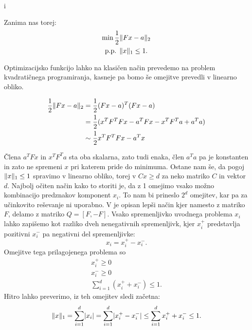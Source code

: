 i\documentclass[mat1]{fmfdelo}
\DeclarePairedDelimiter{\abs}{\lvert}{\rvert}
\DeclarePairedDelimiter{\norm}{\lVert}{\rVert}
\begin{document}
\noindent Zanima nas torej:
\begin{gather*}
    \min \frac{1}{2} \norm{Fx-a}_2 \\
    \text{p.p. } \norm{x}_1 \leq 1.
\end{gather*}

Optimizacijsko funkcijo lahko na klasičen način prevedemo na problem kvadra\-tičnega programiranja, kasneje pa bomo še omejitve prevedli v linearno obliko.

\begin{align*}
        \frac{1}{2} \norm{Fx-a}_2 &= \frac{1}{2} (Fx-a)^T(Fx-a) \\
         &= \frac{1}{2} (x^T F^T F x - a^TFx - x^TF^Ta + a^Ta) \\
         &\sim \frac{1}{2} x^T F^T F x - a^Tx
\end{align*}

Člena $a^TFx$ in $x^TF^Ta$ sta oba skalarna, zato tudi enaka, člen $a^T a$ pa je konstanten in zato ne spremeni $x$ pri katerem pride do minimuma. Ostane nam še, da pogoj $\norm{x}_1 \leq 1$ spravimo v linearno obliko, torej v $Cx \geq d$ za neko matriko $C$ in vektor $d$. Najbolj očiten način kako to storiti je, da z 1 omejimo vsako možno kombinacijo predznakov komponent $x_i$. To nam bi prineslo $2^d$ omejitev, kar pa za učinkovito reševanje ni uporabno. V \cite{l1convex} je opisan lepši način kjer namesto z matriko $F$, delamo z matriko $Q=[F, -F]$. Vsako spremenljivko uvodnega problema $x_i$ lahko zapišemo kot razliko dveh nenegativnih spremenljivk, kjer $x_i^+$ predstavlja pozitivni $x_i^-$ pa negativni del spremenljivke:
\begin{equation*}
    x_i = x_i^+ - x_i^-.
\end{equation*}
Omejitve tega prilagojenega problema so
\begin{align*}
    x_i^+ \geq 0 \\
    x_i^- \geq 0\\
    \sum_{i=1}^d (x_i^+ + x_i^-) \leq 1.
\end{align*}
Hitro lahko preverimo, iz teh omejitev sledi začetna:
\begin{equation*}
    \norm{x}_1 = \sum_{i=1}^d \abs{x_i} = \sum_{i=1}^d \abs{x_i^+ - x_i^-} \leq \sum_{i=1}^d x_i^+ + x_i^- \leq 1.
\end{equation*}
\end{document}
